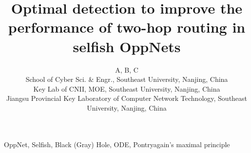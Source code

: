 \documentclass[10pt,conference]{IEEEtran}
\begin{document}
\title{
Optimal detection to improve the performance of two-hop routing in selfish OppNets
}
\author{A, B, C\\
        School of Cyber Sci. \& Engr., Southeast University, Nanjing, China\\
        Key Lab of CNII, MOE, Southeast University, Nanjing, China\\
        Jiangsu Provincial Key Laboratory of Computer Network Technology, Southeast University, Nanjing, China\\
        }
\maketitle

%
\begin{IEEEkeywords}
OppNet, Selfish, Black (Gray) Hole, ODE, Pontryagain's maximal principle
\end{IEEEkeywords}













\end{document}
